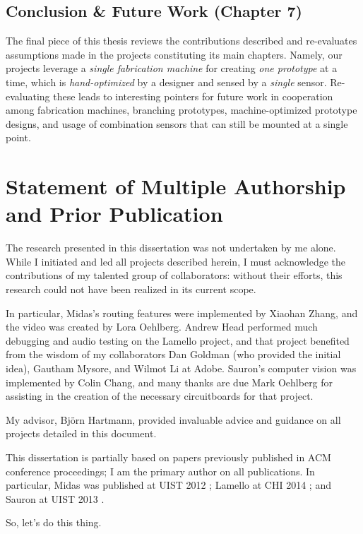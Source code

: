 \subsection{Conclusion \& Future Work (Chapter 7)}

The final piece of this thesis reviews the contributions described and re-evaluates assumptions made in the projects constituting its main chapters. Namely, our projects leverage a \emph{single fabrication machine} for creating \emph{one prototype} at a time, which is \emph{hand-optimized} by a designer and sensed by a \emph{single} sensor. Re-evaluating these leads to interesting pointers for future work in cooperation among fabrication machines, branching prototypes, machine-optimized prototype designs, and usage of combination sensors that can still be mounted at a single point.

\section{Statement of Multiple Authorship and Prior Publication}

The research presented in this dissertation was not undertaken by me alone. While I initiated
and led all projects described herein, I must acknowledge the contributions of my talented group of collaborators: without their efforts, this research could not have been realized in its current scope.

In particular, Midas's routing features were implemented by Xiaohan Zhang, and the video was created by Lora Oehlberg. Andrew Head performed much debugging and audio testing on the Lamello project, and that project benefited from the wisdom of my collaborators Dan Goldman (who provided the initial idea), Gautham Mysore, and Wilmot Li at Adobe. Sauron's computer vision was implemented by Colin Chang, and many thanks are due Mark Oehlberg for assisting in the creation of the necessary circuitboards for that project.

My advisor, Bj\"orn Hartmann, provided invaluable advice and guidance on all projects detailed in this document.

This dissertation is partially based on papers previously published in ACM conference proceedings; I am the primary author on all publications. In particular, Midas was published at UIST 2012 \cite{savage-midas}; Lamello at CHI 2014 \cite{savage-lamello}; and Sauron at UIST 2013 \cite{savage-sauron}.

So, let's do this thing.